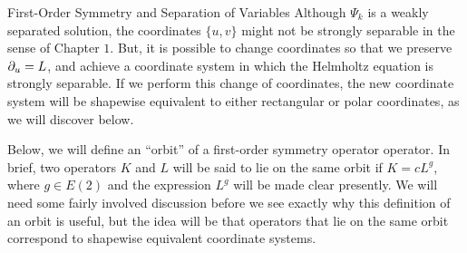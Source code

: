 \begin{section}{First-Order Symmetry and Separation of Variables}
Although $\Psi_k$ is a weakly separated solution, the coordinates $\{ u,v \}$ might not be strongly separable in the sense of Chapter $1$.  But, it is possible to change coordinates so that we  preserve $\partial_{u} = L$, and  achieve a coordinate system in which the Helmholtz equation is strongly separable.  If we perform this change of coordinates, the new coordinate system will be shapewise equivalent to either rectangular or polar coordinates, as we will discover below.

Below, we will define an ``orbit'' of a first-order symmetry operator operator.  In brief, two operators $K$ and $L$ will be said to lie on the same orbit if $K = cL^g$, where $g \in E(2)$ and the expression $L^g$ will be made clear presently.  We will need some fairly involved discussion before we see exactly why this definition of an orbit is useful, but the idea will be that operators that lie on the same orbit correspond to shapewise equivalent coordinate systems.


\end{section}
